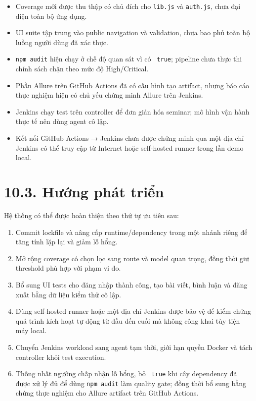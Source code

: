 \documentclass[
  vietnamese,
  12pt,
  a4paper,
  oneside]{report}
\providecommand{\tightlist}{%
  \setlength{\itemsep}{0pt}\setlength{\parskip}{0pt}}
\begin{document}
\begin{itemize}
\tightlist
\item
  Coverage mới được thu thập có chủ đích cho \texttt{lib.js} và
  \texttt{auth.js}, chưa đại diện toàn bộ ứng dụng.
\item
  UI suite tập trung vào public navigation và validation, chưa bao phủ
  toàn bộ luồng người dùng đã xác thực.
\item
  \texttt{npm\ audit} hiện chạy ở chế độ quan sát vì có
  \texttt{\textbar{}\textbar{}\ true}; pipeline chưa thực thi chính sách
  chặn theo mức độ High/Critical.
\item
  Phần Allure trên GitHub Actions đã có cấu hình tạo artifact, nhưng báo
  cáo thực nghiệm hiện có chủ yếu chứng minh Allure trên Jenkins.
\item
  Jenkins chạy test trên controller để đơn giản hóa seminar; mô hình vận
  hành thực tế nên dùng agent cô lập.
\item
  Kết nối GitHub Actions → Jenkins chưa được chứng minh qua một địa chỉ
  Jenkins có thể truy cập từ Internet hoặc self-hosted runner trong lần
  demo local.
\end{itemize}

\section{10.3. Hướng phát
triển}\label{103-hux1b0ux1edbng-phuxe1t-triux1ec3n}

Hệ thống có thể được hoàn thiện theo thứ tự ưu tiên sau:

\begin{enumerate}
\def\labelenumi{\arabic{enumi}.}
\tightlist
\item
  Commit lockfile và nâng cấp runtime/dependency trong một nhánh riêng
  để tăng tính lặp lại và giảm lỗ hổng.
\item
  Mở rộng coverage có chọn lọc sang route và model quan trọng, đồng thời
  giữ threshold phù hợp với phạm vi đo.
\item
  Bổ sung UI tests cho đăng nhập thành công, tạo bài viết, bình luận và
  đăng xuất bằng dữ liệu kiểm thử cô lập.
\item
  Dùng self-hosted runner hoặc một địa chỉ Jenkins được bảo vệ để kiểm
  chứng quá trình kích hoạt tự động từ đầu đến cuối mà không công khai
  tùy tiện máy local.
\item
  Chuyển Jenkins workload sang agent tạm thời, giới hạn quyền Docker và
  tách controller khỏi test execution.
\item
  Thống nhất ngưỡng chấp nhận lỗ hổng, bỏ
  \texttt{\textbar{}\textbar{}\ true} khi cây dependency đã được xử lý
  đủ để dùng \texttt{npm\ audit} làm quality gate; đồng thời bổ sung
  bằng chứng thực nghiệm cho Allure artifact trên GitHub Actions.
\end{enumerate}
\end{document}
